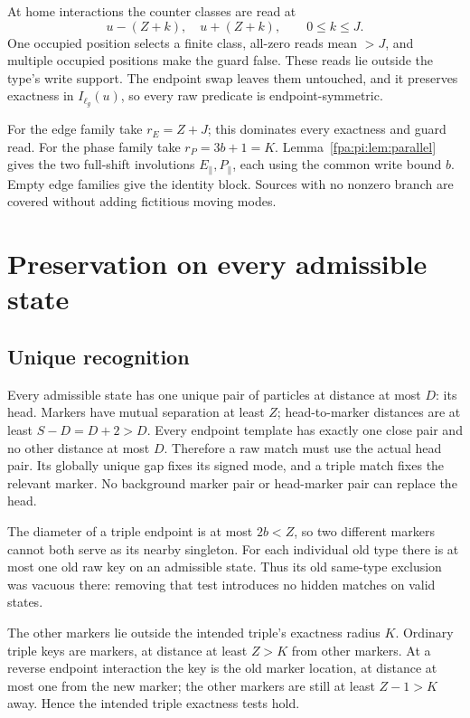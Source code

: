 \documentclass[11pt,a4paper]{article}
\numberwithin{equation}{section}
\newcommand{\parE}{E_{\parallel}}\newcommand{\parP}{P_{\parallel}}
\begin{document}
At home interactions the counter classes are read at
\[
 u-(Z+k),\quad u+(Z+k),\qquad 0\le k\le J.
\]
One occupied position selects a finite class, all-zero reads mean $>J$, and multiple occupied positions make the guard false. These reads lie outside the type's write support. The endpoint swap leaves them untouched, and it preserves exactness in $I_{\ell_g}(u)$, so every raw predicate is endpoint-symmetric.

For the edge family take $r_E=Z+J$; this dominates every exactness and guard read. For the phase family take $r_P=3b+1=K$. Lemma~\ref{fpa:pi:lem:parallel} gives the two full-shift involutions $\parE,\parP$, each using the common write bound $b$. Empty edge families give the identity block. Sources with no nonzero branch are covered without adding fictitious moving modes.

\section{Preservation on every admissible state}\label{fpa:pi:sec:preservation}
\subsection{Unique recognition}
Every admissible state has one unique pair of particles at distance at most $D$: its head. Markers have mutual separation at least $Z$; head-to-marker distances are at least $S-D=D+2>D$. Every endpoint template has exactly one close pair and no other distance at most $D$. Therefore a raw match must use the actual head pair. Its globally unique gap fixes its signed mode, and a triple match fixes the relevant marker. No background marker pair or head-marker pair can replace the head.

The diameter of a triple endpoint is at most $2b<Z$, so two different markers cannot both serve as its nearby singleton. For each individual old type there is at most one old raw key on an admissible state. Thus its old same-type exclusion was vacuous there: removing that test introduces no hidden matches on valid states.

The other markers lie outside the intended triple's exactness radius $K$. Ordinary triple keys are markers, at distance at least $Z>K$ from other markers. At a reverse endpoint interaction the key is the old marker location, at distance at most one from the new marker; the other markers are still at least $Z-1>K$ away. Hence the intended triple exactness tests hold.
\end{document}
